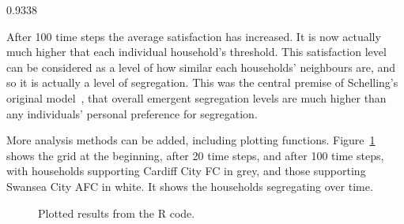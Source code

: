 \begin{Rout}
[1] 0.9338
\end{Rout}

After 100 time steps the average satisfaction has increased.
It is now actually much higher that each individual household's threshold.
This satisfaction level can be considered as a level of how similar each
households' neighbours are, and so it is actually a level of segregation.
This was the central premise of Schelling's original
model~\cite{schelling2006micromotives}, that overall
emergent segregation levels are much higher than any individuals' personal
preference for segregation.

More analysis methods can be added, including plotting functions.
Figure~\ref{fig:schelling_R_plot} shows the grid at the beginning, after 20
time steps, and after 100 time steps, with households supporting Cardiff City FC
in grey, and those supporting Swansea City AFC in white.
It shows the households segregating over time.

\begin{figure}
\begin{center}
\end{center}
\caption{Plotted results from the R code.}
\label{fig:schelling_R_plot}
\end{figure}

